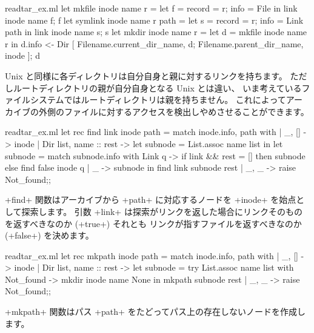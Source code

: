 \begin{answer}
\begin{listingcodefile}{readtar_ex.ml}
let mkfile inode name r =
  let f =  { record = r; info = File } in
  link inode name f; f
let symlink inode name r path =
  let s =  { record = r; info = Link path } in
  link inode name s; s
let mkdir inode name r =
  let d = mkfile inode name r in
  d.info <-
    Dir [ Filename.current_dir_name, d; Filename.parent_dir_name, inode ];
  d
\end{listingcodefile}
%
Unix と同様に各ディレクトリは自分自身と親に対するリンクを持ちます。
ただしルートディレクトリの親が自分自身となる Unix とは違い、
いま考えているファイルシステムではルートディレクトリは親を持ちません。
これによってアーカイブの外側のファイルに対するアクセスを検出しやめさせることができます。
%
\begin{listingcodefile}{readtar_ex.ml}
let rec find link inode path = match inode.info, path with
  | _, [] -> inode
  | Dir list, name :: rest ->
      let subnode = List.assoc name list in
      let subnode =
        match subnode.info with
          Link q ->
            if link && rest = [] then subnode else find false inode q
        | _ -> subnode  in
      find link subnode rest
  | _, _ -> raise Not_found;;
\end{listingcodefile}
%
\ml+find+ 関数はアーカイブから \ml+path+ に対応するノードを \ml+inode+ を始点として探索します。
引数 \ml+link+ は探索がリンクを返した場合にリンクそのものを返すべきなのか (\ml+true+) それとも
リンクが指すファイルを返すべきなのか (\ml+false+) を決めます。
%
\begin{listingcodefile}{readtar_ex.ml}
let rec mkpath inode path =
  match inode.info, path with
  | _, [] -> inode
  | Dir list, name :: rest ->
      let subnode =
        try List.assoc name list
        with Not_found ->  mkdir inode name None in
      mkpath subnode rest
  | _, _ -> raise Not_found;;
\end{listingcodefile}
%
\ml+mkpath+ 関数はパス \ml+path+ をたどってパス上の存在しないノードを作成します。

\end{answer}
